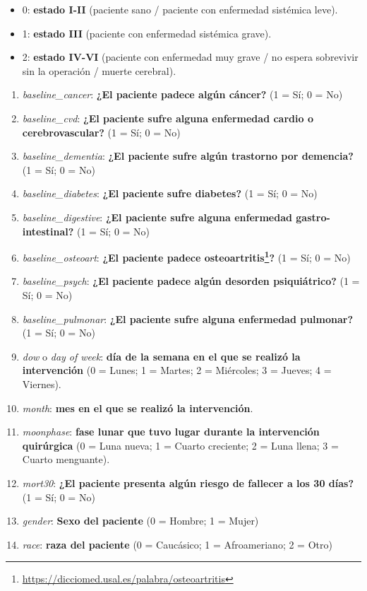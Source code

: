 \documentclass[
]{article}
\providecommand{\tightlist}{%
  \setlength{\itemsep}{0pt}\setlength{\parskip}{0pt}}
\begin{document}
\begin{itemize}
\tightlist
\item
  0: \textbf{estado I-II} (paciente sano / paciente con enfermedad
  sistémica leve).
\item
  1: \textbf{estado III} (paciente con enfermedad sistémica grave).
\item
  2: \textbf{estado IV-VI} (paciente con enfermedad muy grave / no
  espera sobrevivir sin la operación / muerte cerebral).
\end{itemize}

\begin{enumerate}
\def\labelenumi{\arabic{enumi}.}
\setcounter{enumi}{8}
\item
  \emph{baseline\_cancer}: \textbf{¿El paciente padece algún cáncer?} (1
  = Sí; 0 = No)
\item
  \emph{baseline\_cvd}: \textbf{¿El paciente sufre alguna enfermedad
  cardio o cerebrovascular?} (1 = Sí; 0 = No)
\item
  \emph{baseline\_dementia}: \textbf{¿El paciente sufre algún trastorno
  por demencia?} (1 = Sí; 0 = No)
\item
  \emph{baseline\_diabetes}: \textbf{¿El paciente sufre diabetes?} (1 =
  Sí; 0 = No)
\item
  \emph{baseline\_digestive}: \textbf{¿El paciente sufre alguna
  enfermedad gastro-intestinal?} (1 = Sí; 0 = No)
\item
  \emph{baseline\_osteoart}: \textbf{¿El paciente padece
  osteoartritis\footnote{\url{https://dicciomed.usal.es/palabra/osteoartritis}}?}
  (1 = Sí; 0 = No)
\item
  \emph{baseline\_psych}: \textbf{¿El paciente padece algún desorden
  psiquiátrico?} (1 = Sí; 0 = No)
\item
  \emph{baseline\_pulmonar}: \textbf{¿El paciente sufre alguna
  enfermedad pulmonar?} (1 = Sí; 0 = No)
\item
  \emph{dow} o \emph{day of week}: \textbf{día de la semana en el que se
  realizó la intervención} (0 = Lunes; 1 = Martes; 2 = Miércoles; 3 =
  Jueves; 4 = Viernes).
\item
  \emph{month}: \textbf{mes en el que se realizó la intervención}.
\item
  \emph{moonphase}: \textbf{fase lunar que tuvo lugar durante la
  intervención quirúrgica} (0 = Luna nueva; 1 = Cuarto creciente; 2 =
  Luna llena; 3 = Cuarto menguante).
\item
  \emph{mort30}: \textbf{¿El paciente presenta algún riesgo de fallecer
  a los 30 días?} (1 = Sí; 0 = No)
\item
  \emph{gender}: \textbf{Sexo del paciente} (0 = Hombre; 1 = Mujer)
\item
  \emph{race}: \textbf{raza del paciente} (0 = Caucásico; 1 =
  Afroameriano; 2 = Otro)
\end{enumerate}
\end{document}
